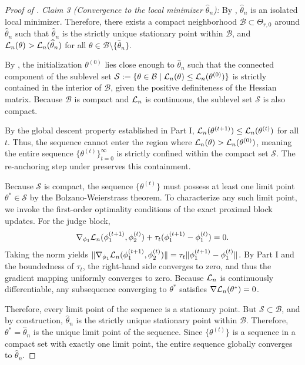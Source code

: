 \documentclass{article}
\begin{document}
\begin{bibunit}[unsrtnat]
\begin{proof}[Proof of ]
\textit{Claim 3 (Convergence to the local minimizer $\hat{\theta}_n$):}
By , $\hat{\theta}_n$ is an isolated local minimizer. Therefore, there exists a compact neighborhood $\mathcal{B} \subset \Theta_{r,0}$ around $\hat{\theta}_n$ such that $\hat{\theta}_n$ is the strictly unique stationary point within $\mathcal{B}$, and $\mathcal{L}_n(\theta) > \mathcal{L}_n(\widehat{\theta}_n)$ for all $\theta \in \mathcal{B} \setminus \{\hat{\theta}_n\}$. 

By , the initialization $\theta^{(0)}$ lies close enough to $\hat{\theta}_n$ such that the connected component of the sublevel set $\mathcal{S} := \{ \theta \in \mathcal{B} \mid \mathcal{L}_n(\theta) \le \mathcal{L}_n(\theta^{(0)}) \}$ is strictly contained in the interior of $\mathcal{B}$, given the positive definiteness of the Hessian matrix.
Because $\mathcal{B}$ is compact and $\mathcal{L}_n$ is continuous, the sublevel set $\mathcal{S}$ is also compact. 

By the global descent property established in Part I, $\mathcal{L}_n(\theta^{(t+1)}) \le \mathcal{L}_n(\theta^{(t)})$ for all $t$. Thus, the sequence cannot enter the region where $\mathcal{L}_n(\theta) > \mathcal{L}_n(\theta^{(0)})$, meaning the entire sequence $\{\theta^{(t)}\}_{t=0}^\infty$ is strictly confined within the compact set $\mathcal{S}$. The re-anchoring step under  preserves this containment.

Because $\mathcal{S}$ is compact, the sequence $\{\theta^{(t)}\}$ must possess at least one limit point $\theta^\ast \in \mathcal{S}$ by the Bolzano-Weierstrass theorem. To characterize any such limit point, we invoke the first-order optimality conditions of the exact proximal block updates. For the judge block,
\[
\nabla_{\phi_1} \mathcal{L}_n(\phi_1^{(t+1)}, \phi_2^{(t)}) + \tau_t (\phi_1^{(t+1)} - \phi_1^{(t)}) = 0.
\]
Taking the norm yields $\| \nabla_{\phi_1} \mathcal{L}_n(\phi_1^{(t+1)}, \phi_2^{(t)}) \| = \tau_t \| \phi_1^{(t+1)} - \phi_1^{(t)} \|$. 
By Part I and the boundedness of $\tau_t$, the right-hand side converges to zero, and thus the gradient mapping uniformly converges to zero. Because $\mathcal{L}_n$ is continuously differentiable, any subsequence converging to $\theta^\ast$ satisfies $\nabla \mathcal{L}_n(\theta^\ast) = 0$. 

Therefore, every limit point of the sequence is a stationary point. But $\mathcal{S} \subset \mathcal{B}$, and by construction, $\hat{\theta}_n$ is the strictly unique stationary point within $\mathcal{B}$. Therefore, $\theta^\ast = \hat{\theta}_n$ is the unique limit point of the sequence. Since $\{\theta^{(t)}\}$ is a sequence in a compact set with exactly one limit point, the entire sequence globally converges to $\hat{\theta}_n$.


\end{proof}
\end{bibunit}
\end{document}

